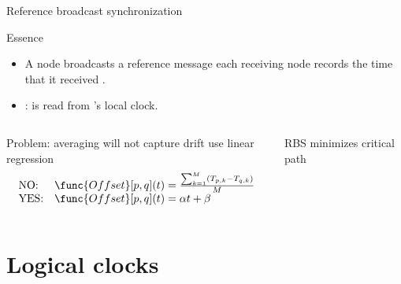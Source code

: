 \begin{slide}{Reference broadcast synchronization}
  \begin{block}{Essence}
    \begin{itemize}\tightlist
    \item A node broadcasts a reference message  \mathexpr{\Rightarrow} each receiving node 
      records the time  that it received . 
    \item {}:  is read from 's local clock. 
    \end{itemize}
  \end{block}
  \begin{columns}[T]
    \begin{column}{0.5\textwidth}
      \begin{block}{Problem: averaging will not capture drift \mathexpr{\Rightarrow} use linear regression}
        \[
        \begin{array}{ll}
        \mbox{NO:}  & \func{Offset}[p,q](t) = \frac{\sum_{k=1}^{M} ( T_{p,k} - T_{q,k} )}{M} \\
        \mbox{YES:} & \func{Offset}[p,q](t) = \alpha t + \beta
        \end{array}
        \]
      \end{block}
    \end{column}
    \begin{column}{0.45\textwidth}
      \begin{block}{RBS minimizes critical path}
        \begin{center}
        \end{center}
      \end{block}
    \end{column}
  \end{columns}
\end{slide}
\section{Logical clocks}
